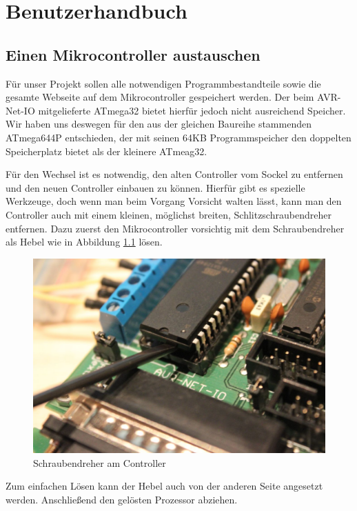 \chapter{Benutzerhandbuch} 
\label{chap:Benutzerhandbuch}

\section{Einen Mikrocontroller austauschen}
Für unser Projekt sollen alle notwendigen Programmbestandteile sowie die gesamte
Webseite auf dem Mikrocontroller gespeichert werden. Der beim AVR-Net-IO
mitgelieferte ATmega32 bietet hierfür jedoch nicht ausreichend Speicher.
Wir haben uns deswegen für den aus der gleichen Baureihe stammenden ATmega644P
entschieden, der mit seinen 64KB Programmspeicher den doppelten Speicherplatz
bietet als der kleinere ATmeag32.

Für den Wechsel ist es notwendig, den alten Controller vom Sockel zu entfernen
und den neuen Controller einbauen zu können. Hierfür gibt es spezielle
Werkzeuge, doch wenn man beim Vorgang Vorsicht walten lässt, kann man den
Controller auch mit einem kleinen, möglichst breiten, Schlitzschraubendreher
entfernen. Dazu zuerst den Mikrocontroller vorsichtig mit dem Schraubendreher
als Hebel wie in Abbildung \ref{ausbau1} lösen.

\begin{figure}[H]
\centering
\includegraphics[width=13cm]{content/pictures/Anleitung/tauscheProzessor/1_Hebel.jpg}
\caption{Schraubendreher am Controller}
\label{ausbau1}
\end{figure}

Zum einfachen Lösen kann der Hebel auch von der anderen Seite angesetzt
werden. Anschließend den gelösten Prozessor abziehen.

